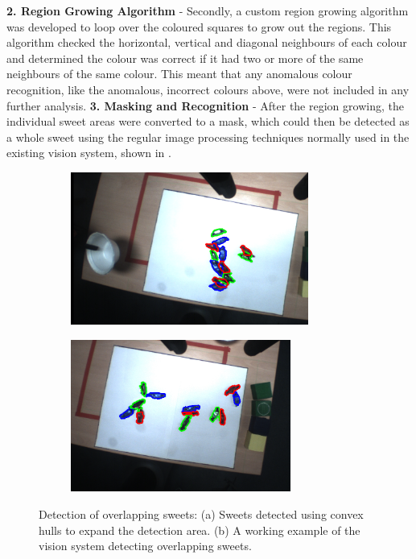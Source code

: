 \textbf{2. Region Growing Algorithm} - Secondly, a custom region growing algorithm was developed to loop over the coloured squares to grow out the regions. This algorithm checked the horizontal, vertical and diagonal neighbours of each colour and determined the colour was correct if it had two or more of the same neighbours of the same colour. This meant that any anomalous colour recognition, like the anomalous, incorrect colours above, were not included in any further analysis.
\newline\newline
\textbf{3. Masking and Recognition} - After the region growing, the individual sweet areas were converted to a mask, which could then be detected as a whole sweet using the regular image processing techniques normally used in the existing vision system, shown in \textbf{}. 
\begin{figure}[H]
    \captionsetup[subfigure]{justification=centering}
    \begin{subfigure}[H]{0.475\textwidth}   
        \centering 
        \caption{}
        \includegraphics[width=\textwidth, height=5cm]{convexhulloverlappissues.png}
        \label{fig:convexhull}
    \end{subfigure}
    \begin{subfigure}[H]{0.475\textwidth}   
        \centering
        \caption{}
        \includegraphics[width=\textwidth, height=5cm]{collisioncorrectdetection.png}
        \label{fig:collisioncorrect}
    \end{subfigure}
    \caption{Detection of overlapping sweets: (a) Sweets detected using convex hulls to expand the detection area. (b) A working example of the vision system detecting overlapping sweets.}
\end{figure}
